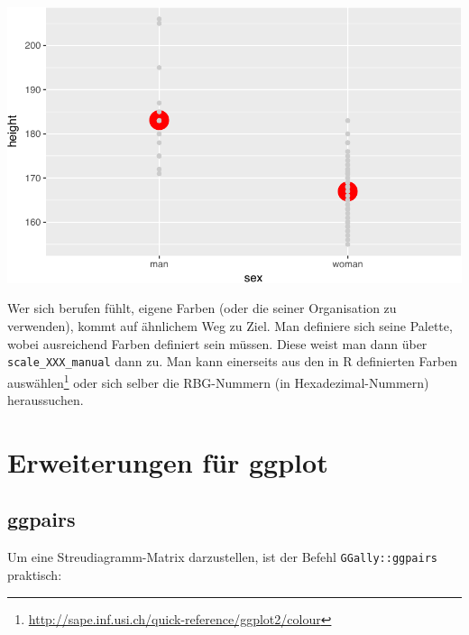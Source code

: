 \documentclass[12pt,]{book}
\newenvironment{Shaded}{\begin{snugshade}}{\end{snugshade}}
\newcommand{\KeywordTok}[1]{\textcolor[rgb]{0.13,0.29,0.53}{\textbf{{#1}}}}
\newcommand{\DataTypeTok}[1]{\textcolor[rgb]{0.13,0.29,0.53}{{#1}}}
\newcommand{\DecValTok}[1]{\textcolor[rgb]{0.00,0.00,0.81}{{#1}}}
\newcommand{\StringTok}[1]{\textcolor[rgb]{0.31,0.60,0.02}{{#1}}}
\newcommand{\NormalTok}[1]{{#1}}
\let\rmarkdownfootnote\footnote%
\def\footnote{\protect\rmarkdownfootnote}
\begin{document}
\begin{Shaded}
\begin{Highlighting}[]
{{{\KeywordTok{grid.arrange}\NormalTok{(p1, p2, p3, }\DataTypeTok{ncol =} \DecValTok{3}\NormalTok{)}
\end{Highlighting}
\end{Shaded}

\begin{center}\includegraphics[width=0.7\linewidth]{050_Daten_visualisieren_files/figure-latex/unnamed-chunk-32-1} \end{center}

Wer sich berufen fühlt, eigene Farben (oder die seiner Organisation zu
verwenden), kommt auf ähnlichem Weg zu Ziel. Man definiere sich seine
Palette, wobei ausreichend Farben definiert sein müssen. Diese weist man
dann über \texttt{scale\_XXX\_manual} dann zu. Man kann einerseits aus
den in R definierten Farben auswählen\footnote{\url{http://sape.inf.usi.ch/quick-reference/ggplot2/colour}}
oder sich selber die RBG-Nummern (in Hexadezimal-Nummern) heraussuchen.

\section{Erweiterungen für ggplot}\label{erweiterungen-fur-ggplot}

\subsection{ggpairs}\label{ggpairs}

Um eine Streudiagramm-Matrix darzustellen, ist der Befehl
\texttt{GGally::ggpairs} praktisch:

\begin{Shaded}
\end{Shaded}
\end{document}

